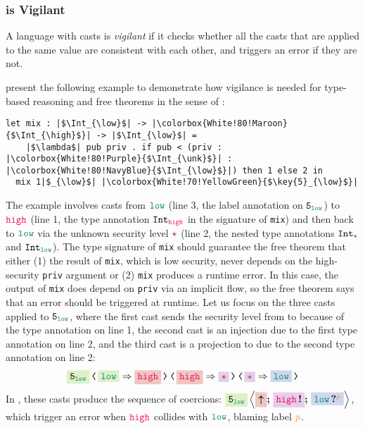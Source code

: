 \subsubsection{\Surface is Vigilant}

A language with casts is \textit{vigilant} if it checks whether all the casts
that are applied to the same value are consistent with each other, and triggers
an error if they are not.

\textcite{Toro:2018aa} present the following example to demonstrate how vigilance
is needed for type-based reasoning and free theorems in the sense of
\textcite{Wadler:1989fk}:

\begin{lstlisting}[style=tt]
  let mix : |$\Int_{\low}$| -> |\colorbox{White!80!Maroon}{$\Int_{\high}$}| -> |$\Int_{\low}$| =
    |$\lambda$| pub priv . if pub < (priv : |\colorbox{White!80!Purple}{$\Int_{\unk}$}| : |\colorbox{White!80!NavyBlue}{$\Int_{\low}$}|) then 1 else 2 in
  mix 1|$_{\low}$| |\colorbox{White!70!YellowGreen}{$\key{5}_{\low}$}|
\end{lstlisting}

\noindent The example involves casts from $\low$ (line 3, the label annotation
on $\key{5}_{\low}$) to $\high$ (line 1, the type annotation $\Int_{\high}$ in
the signature of \texttt{mix}) and then back to $\low$ via the unknown security
level $\unk$ (line 2, the nested type annotations $\Int_{\unk}$ and
$\Int_{\low}$). The type signature of \texttt{mix} should guarantee the free
theorem that either (1) the result of \texttt{mix}, which is low security, never
depends on the high-security \texttt{priv} argument or (2) \texttt{mix} produces
a runtime error. In this case, the output of \texttt{mix} does depend on
\texttt{priv} via an implicit flow, so the free theorem says that an error
should be triggered at runtime. Let us focus on the three casts applied to
$\key{5}_{\low}$, where the first cast sends the security level from \low to
\high because of the type annotation on line 1, the second cast is an injection
due to the first type annotation on line 2, and the third cast is a projection
to \low due to the second type annotation on line 2:
\[
\cccast{
  \cccast{
    \cccast{\colorbox{White!70!YellowGreen}{$\key{5}_{\low}$}}{\colorbox{White!70!YellowGreen}{\low} \Rightarrow \colorbox{White!80!Maroon}{\high}}
  }{\colorbox{White!80!Maroon}{\high} \Rightarrow \colorbox{White!80!Purple}{\unk}}}
  {\colorbox{White!80!Purple}{\unk} \Rightarrow \colorbox{White!80!NavyBlue}{\low}}
\]
In \Surface, these casts produce the sequence of coercions:
$\colorbox{White!70!YellowGreen}{$\key{5}_{\low}$} \left\langle
\colorbox{White!80!Maroon}{\up} \seq \colorbox{White!80!Purple}{\inj{\high}}
\seq \colorbox{White!80!NavyBlue}{\proj{\low}{p}} \right\rangle$, which trigger
an error when $\high$ collides with $\low$, blaming label $\bl{p}$.

